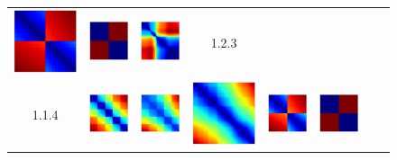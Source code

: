 \documentclass[bachelor, nocolorlinks, printoneside]{seuthesis} %
\begin{document}
\begin{Main}
\begin{figure}[ht!]
\begin{centering}
\begin{tabular}{cccc|cccc}
        \includegraphics[width=0.12\columnwidth,keepaspectratio]{figs/toyset_matrices/cluster_2by10_3_1.png} &
        \includegraphics[width=0.12\columnwidth,keepaspectratio]{figs/toyset_matrices/cluster_2by10_3_2.png} &
        \includegraphics[width=0.12\columnwidth,keepaspectratio]{figs/toyset_matrices/cluster_2by10_3_3.png} & 1.2.3\\
        1.1.4 &\includegraphics[width=0.12\columnwidth,keepaspectratio]{figs/toyset_matrices/cluster_5by20_4_1.png} &
        \includegraphics[width=0.12\columnwidth,keepaspectratio]{figs/toyset_matrices/cluster_5by20_4_2.png} &
        \includegraphics[width=0.12\columnwidth,keepaspectratio]{figs/toyset_matrices/cluster_5by20_4_3.png} &  
        \includegraphics[width=0.12\columnwidth,keepaspectratio]{figs/toyset_matrices/cluster_2by10_4_1.png} &
        \includegraphics[width=0.12\columnwidth,keepaspectratio]{figs/toyset_matrices/cluster_2by10_4_2.png} &

\end{tabular}
\end{centering}
\end{figure}
\end{Main}
\end{document}

